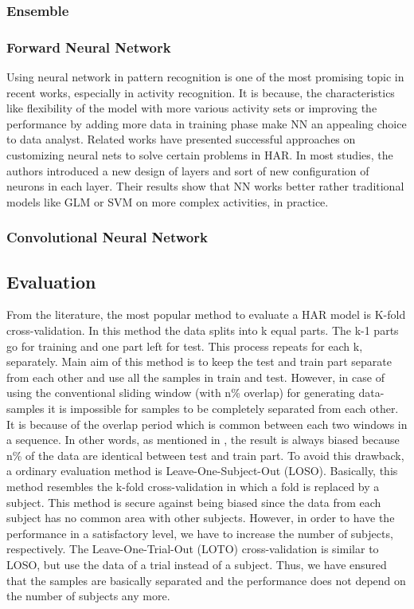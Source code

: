 \documentclass[journal,article,submit,moreauthors,pdftex]{Definitions/mdpi}
\begin{document}
\subsubsection{Ensemble}
\subsubsection{Forward Neural Network}

Using neural network in pattern recognition is one of the most promising topic in recent works, especially in activity recognition. It is because, the characteristics like flexibility of the model with more various activity sets or improving the performance by adding more data in training phase make NN an appealing choice to data analyst. Related works have presented successful approaches on customizing neural nets to solve certain problems in HAR. In most studies, the authors introduced a new design of layers and sort of new configuration of neurons in each layer. Their results show that NN works better rather traditional models like GLM or SVM on more complex activities, in practice.


\subsubsection{Convolutional Neural Network}



\subsection{Evaluation}
From the literature, the most popular method to evaluate a HAR model is K-fold cross-validation. In this method the data splits into k equal parts. The k-1 parts go for training and one part left for test. This process repeats for each k, separately. Main aim of this method is to keep the test and train part separate from each other and use all the samples in train and test. However, in case of using the conventional sliding window (with n\% overlap) for generating data-samples it is impossible for samples to be completely separated from each other. It is because of the overlap period which is common between each two windows in a sequence. In other words, as mentioned in \cite{jordao2018human}, the result is always biased because n\% of the data are identical between test and train part. To avoid this drawback, a ordinary evaluation method is Leave-One-Subject-Out (LOSO). Basically, this method resembles the k-fold cross-validation in which a fold is replaced by a subject. This method is secure against being biased since the data from each subject has no common area with other subjects. However, in order to have the performance in a satisfactory level, we have to increase the number of subjects, respectively. The Leave-One-Trial-Out (LOTO) cross-validation\cite{jordao2018human} is similar to LOSO, but use the data of a trial instead of a subject. Thus, we have ensured that the samples are basically separated and the performance does not depend on the number of subjects any more.
\end{document}
